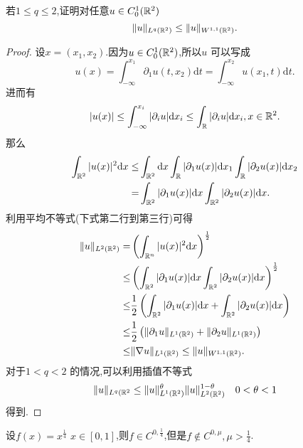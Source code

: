 \begin{exercise}
  若$1\le q\le 2$,证明对任意$u\in C^{1}_0(\mathbb{R}^2)$ 
  \[
    \|u\|_{L^{q}(\mathbb{R}^2)}\le \|u\|_{W^{1,1}(\mathbb{R}^2)}.
  \] 
\end{exercise}
\begin{proof}
  设$x=(x_1,x_2)$.因为$u\in C^{1}_0(\mathbb{R}^2)$,所以$u$ 可以写成
  \[
    u(x)=\int_{-\infty}^{x_1}\partial_1 u(t,x_2)\mathrm{d}t=\int_{-\infty}^{x_2}u(x_1,t)\mathrm{d}t.
  \] 
  进而有
  \[
    |u(x)|\le \int_{-\infty}^{x_i}|\partial_{i}u|\mathrm{d}x_i\le \int_{\mathbb{R}}|\partial_i u|\mathrm{d}x_i, x\in \mathbb{R}^2
  .\]
  那么
  \begin{align*}
    \int_{\mathbb{R}^2}|u(x)|^2\mathrm{d}x\le& \int_{\mathbb{R}^2}\mathrm{d}x\int_{\mathbb{R}}|\partial_1 u(x)|\mathrm{d}x_1\int_{\mathbb{R}} |\partial_2u(x)|\mathrm{d}x_2\\
    =&\int_{\mathbb{R}^2}|\partial_1 u(x)|\mathrm{d}x \int_{\mathbb{R}^2}|\partial_2 u(x)|\mathrm{d}x
  .\end{align*}
  利用平均不等式(下式第二行到第三行)可得
  \begin{align*}
    \|u\|_{L^2(\mathbb{R}^2)}=&\left( \int_{\mathbb{R}^{n}}|u(x)|^2\mathrm{d}x \right) ^{\frac{1}{2}}\\
    \le& \left( \int_{\mathbb{R}^2}|\partial_1 u(x)|\mathrm{d}x \int_{\mathbb{R}^2}|\partial_2u(x)|\mathrm{d}x \right) ^{\frac{1}{2}}\\
    \le&\frac{1}{2}\left( \int_{\mathbb{R}^2}|\partial_1u(x)|\mathrm{d}x+\int_{\mathbb{R}^2}|\partial_2u(x)|\mathrm{d}x \right)\\
    \le &\frac{1}{2}\left( \|\partial_1u\|_{L^{1}(\mathbb{R}^2)}+\|\partial_2 u\|_{L^{1}(\mathbb{R}^2)}\right)\\
    \le  & \|\nabla  u\|_{L^{1}(\mathbb{R}^2)}\le \|u\|_{W^{1,1}(\mathbb{R}^2)}
  .\end{align*}
  对于$1<q<2$ 的情况,可以利用插值不等式
  \[
    \|u\|_{L^{q}(\mathbb{R}^2}\le \|u\|_{L^{1}(\mathbb{R}^2)}^{\theta}\|u\|^{1-\theta}_{L^{2}(\mathbb{R}^2)} \quad 0<\theta<1
  \] 
  得到.
\end{proof}
\begin{exercise}
  设$f(x)=x^{\frac{1}{4}}$ $x\in [0,1]$,则$f\in C^{0, \frac{1}{4}}$,但是$f\notin C^{0,\mu},\mu>\frac{1}{4}$. 
\end{exercise}
